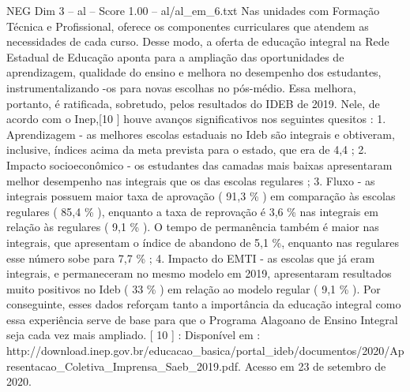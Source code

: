 \begin{textsample}{NEG Dim 3 – al – Score 1.00 – al/al\_em\_6.txt}
Nas unidades com Formação Técnica e Profissional, oferece os componentes curriculares que atendem as necessidades de cada curso.
Desse modo, a oferta de educação integral na Rede Estadual de Educação aponta para a ampliação das oportunidades de aprendizagem, qualidade do ensino e melhora no desempenho dos estudantes, instrumentalizando -os para novas escolhas no pós-médio.
Essa melhora, portanto, é ratificada, sobretudo, pelos resultados do IDEB de 2019.
Nele, de acordo com o Inep,[10 ] houve avanços significativos nos seguintes quesitos : 1.
Aprendizagem - as melhores escolas estaduais no Ideb são integrais e obtiveram, inclusive, índices acima da meta prevista para o estado, que era de 4,4 ; 2.
Impacto socioeconômico - os estudantes das camadas mais baixas apresentaram melhor desempenho nas integrais que os das escolas regulares ; 3.
Fluxo - as integrais possuem maior taxa de aprovação ( 91,3 \% ) em comparação às escolas regulares ( 85,4 \% ), enquanto a taxa de reprovação é 3,6 \% nas integrais em relação às regulares ( 9,1 \% ).
O tempo de permanência também é maior nas integrais, que apresentam o índice de abandono de 5,1 \%, enquanto nas regulares esse número sobe para 7,7 \% ; 4.
Impacto do EMTI - as escolas que já eram integrais, e permaneceram no mesmo modelo em 2019, apresentaram resultados muito positivos no Ideb ( 33 \% ) em relação ao modelo regular ( 9,1 \% ).
Por conseguinte, esses dados reforçam tanto a importância da educação integral como essa experiência serve de base para que o Programa Alagoano de Ensino Integral seja cada vez mais ampliado. [ 10 ] : Disponível em : http://download.inep.gov.br/educacao\_basica/portal\_ideb/documentos/2020/Apresentacao\_Coletiva\_Imprensa\_Saeb\_2019.pdf.
Acesso em 23 de setembro de 2020.

\end{textsample}
